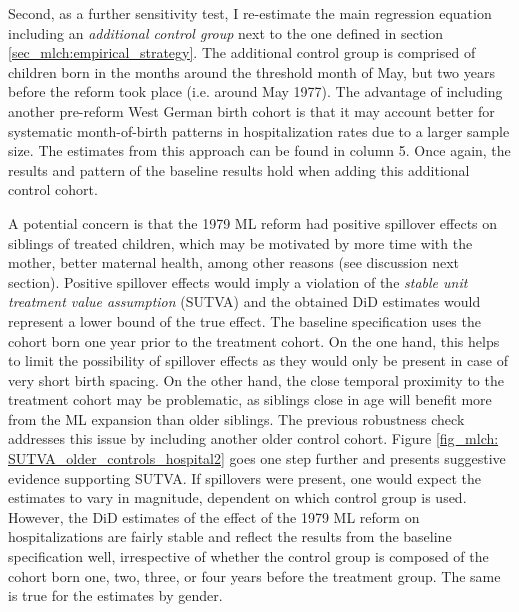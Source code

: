 Second, as a further sensitivity test, I re-estimate the main regression equation including an \textit{additional control group} next to the one defined in section \ref{sec_mlch:empirical_strategy}. The additional control group is comprised of children born in the months around the threshold month of May, but two years before the reform took place (i.e. around May 1977). The advantage of including another pre-reform West German birth cohort is that it may account better for systematic month-of-birth patterns in hospitalization rates due to a larger sample size. The estimates from this approach can be found in column 5. Once again, the results and pattern of the baseline results hold when adding this additional control cohort.



A potential concern is that the 1979 ML reform had positive spillover effects on siblings of treated children, which may be motivated by more time with the mother, better maternal health, among other reasons (see discussion next section). Positive spillover effects would imply a violation of the \textit{stable unit treatment value assumption} (SUTVA) and the obtained DiD estimates would represent a lower bound of the true effect. The baseline specification uses the cohort born one year prior to the treatment cohort. On the one hand, this helps to limit the possibility of spillover effects as they would only be present in case of very short birth spacing. On the other hand, the close temporal proximity to the treatment cohort may be problematic, as siblings close in age will benefit more from the ML expansion than older siblings. The previous robustness check addresses this issue by including another older control cohort. Figure \ref{fig_mlch: SUTVA_older_controls_hospital2} goes one step further and presents suggestive evidence supporting SUTVA. If spillovers were present, one would expect the estimates to vary in magnitude, dependent on which control group is used. However, the DiD estimates of the effect of the 1979 ML reform on hospitalizations are fairly stable and reflect the results from the baseline specification well, irrespective of whether the control group is composed of the cohort born one, two, three, or four years before the treatment group. The same is true for the estimates by gender.\newline




